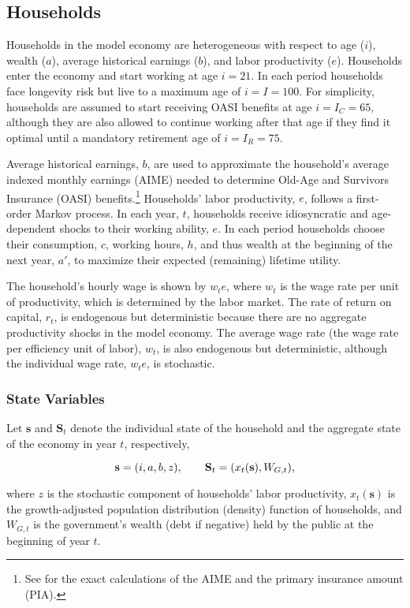 \documentclass[11pt,leqno,fleqn]{article}
\newcommand{\be}{\vspace{-1em}\begin{singlespace}\begin{equation}}
\newcommand{\ee}{\end{equation}\end{singlespace}}
\begin{document}
\subsection{Households}

Households in the model economy are heterogeneous with respect to age ($i$), wealth ($a$), average historical earnings ($b$), and labor productivity ($e$). Households enter the economy and start working at age $i=21$. In each period households face longevity risk but live to a maximum age of $i=I=100$. For simplicity, households are assumed to start receiving OASI benefits at age $i=I_C=65$, although they are also allowed to continue working after that age if they find it optimal until a mandatory retirement age of $i=I_R=75$.

Average historical earnings, $b$, are used to approximate the household's average indexed monthly earnings (AIME) needed to determine Old-Age and Survivors Insurance (OASI) benefits.\footnote{See \citet{SSA:2014} for the exact calculations of the AIME and the primary insurance amount (PIA).} Households' labor productivity, $e$, follows a first-order Markov process. In each year, $t$, households receive idiosyncratic and age-dependent shocks to their working ability, $e$. In each period households choose their consumption, $c$, working hours, $h$, and thus wealth at the beginning of the next year, $a'$, to maximize their expected (remaining) lifetime utility.

The household's hourly wage is shown by $w_{t}e$, where $w_{t}$ is the wage rate per unit of productivity, which is determined by the labor market. The rate of return on capital, $r_{t}$, is endogenous but deterministic because there are no aggregate productivity shocks in the model economy. The average wage rate (the wage rate per efficiency unit of labor), $w_{t}$, is also endogenous but deterministic, although the individual wage rate, $w_{t}e$, is stochastic.

\subsubsection{State Variables}

Let $\mathbf{s}$ and $\mathbf{S}_{t}$ denote the individual state of the household and the aggregate state of the economy in year $t$, respectively,

\be \mathbf{s}=(i,a,b,z),\qquad\mathbf{S}_{t}=(x_{t}(\mathbf{s}),W_{G,t}), \notag \ee

where $z$ is the stochastic component of households' labor productivity, $x_{t}(\mathbf{s})$ is the growth-adjusted population distribution (density) function of households, and $W_{G,t}$ is the government's wealth (debt if negative) held by the public at the beginning of year $t$. 
\end{document}

